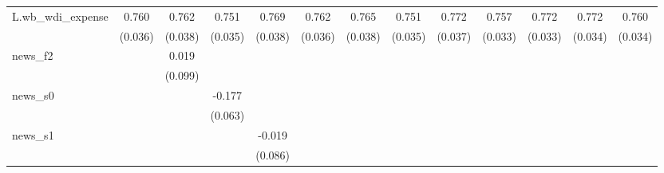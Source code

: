 {\begin{tabular}{l*{12}{c}}
\addlinespace
L.wb\_wdi\_expense&       0.760\sym{***}&       0.762\sym{***}&       0.751\sym{***}&       0.769\sym{***}&       0.762\sym{***}&       0.765\sym{***}&       0.751\sym{***}&       0.772\sym{***}&       0.757\sym{***}&       0.772\sym{***}&       0.772\sym{***}&       0.760\sym{***}\\
            &     (0.036)         &     (0.038)         &     (0.035)         &     (0.038)         &     (0.036)         &     (0.038)         &     (0.035)         &     (0.037)         &     (0.033)         &     (0.033)         &     (0.034)         &     (0.034)         \\
\addlinespace
news\_f2     &                     &       0.019         &                     &                     &                     &                     &                     &                     &                     &                     &                     &                     \\
            &                     &     (0.099)         &                     &                     &                     &                     &                     &                     &                     &                     &                     &                     \\
\addlinespace
news\_s0     &                     &                     &      -0.177\sym{***}&                     &                     &                     &                     &                     &                     &                     &                     &                     \\
            &                     &                     &     (0.063)         &                     &                     &                     &                     &                     &                     &                     &                     &                     \\
\addlinespace
news\_s1     &                     &                     &                     &      -0.019         &                     &                     &                     &                     &                     &                     &                     &                     \\
            &                     &                     &                     &     (0.086)         &                     &                     &                     &                     &                     &                     &                     &                     \\

\end{tabular}}
